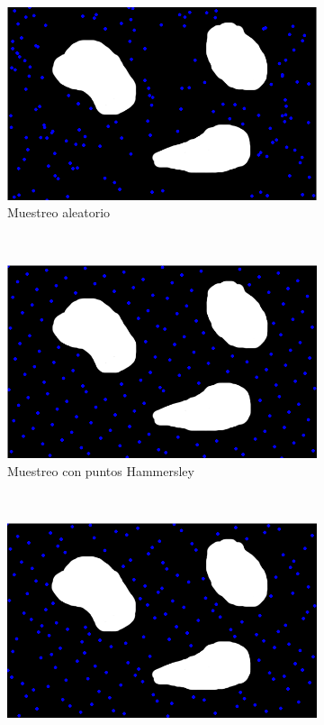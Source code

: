 \begin{figure}[h]
		\centering
        \begin{subfigure}[b]{0.3\textwidth}
                \centering
                \includegraphics[width=\textwidth]{images/random.png}
                \caption{Muestreo aleatorio}
                \label{fig:muestreo_aleatorio}
        \end{subfigure}
        ~
        \begin{subfigure}[b]{0.3\textwidth}
                \centering
                \includegraphics[width=\textwidth]{images/hammersley.png}
                \caption{Muestreo con puntos Hammersley}
                \label{fig:muestreo_hammersley}
        \end{subfigure}
        ~
        \begin{subfigure}[b]{0.3\textwidth}
         	   \centering
                \includegraphics[width=\textwidth]{images/halton.png}

\end{subfigure}
\end{figure}
